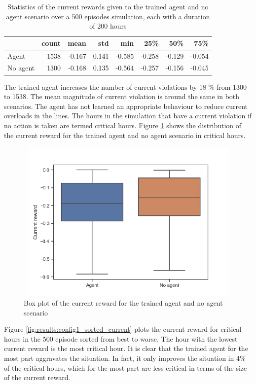 \documentclass[class=book, crop=false]{standalone}
\begin{document}
\begin{table}[h]
\center
\begin{tabular}{l|rrrrrrr}
         & count & mean   & std   & min    & 25\%   & 50\%   & 75\%   \\
\hline
Agent    & 1538  & -0.167 & 0.141 & -0.585 & -0.258 & -0.129 & -0.054 \\
No agent & 1300  & -0.168 & 0.135 & -0.564 & -0.257 & -0.156 & -0.045 \\
\hline
\end{tabular}
\caption{Statistics of the current rewards given to the trained agent and no agent scenario over a 500 episodes simulation, each with a duration of 200 hours}
\label{table:results:configuration1_reward_500_episodes_current}
\end{table}
The trained agent increases the number of current violations by 18 \% from 1300 to 1538. The mean magnitude of current violation is around the same in both scenarios. The agent has not learned an appropriate behaviour to reduce current overloads in the lines. The hours in the simulation that have a current violation if no action is taken are termed critical hours. Figure \ref{fig:results:config1_current_boxplot} shows the distribution of the current reward for the trained agent and no agent scenario in critical hours. 

\begin{figure}[H]
    \center
\includegraphics[height=8cm, width=12cm]{figures/config1_current_boxplot.png}
    \caption[size = 9]{Box plot of the current reward for the trained agent and no agent scenario}
    \label{fig:results:config1_current_boxplot}
\end{figure}
Figure \ref{fig:results:config1_sorted_current} plots the current reward for critical hours in the 500 episode sorted from best to worse. The hour with the lowest current reward is the most critical hour. It is clear that the trained agent for the most part aggravates the situation. In fact, it only improves the situation in 4\% of the critical hours, which for the most part are less critical in terms of the size of the current reward. 
\end{document}
